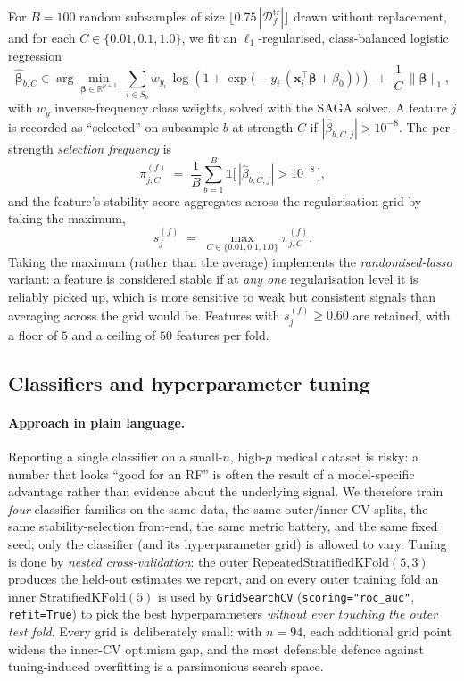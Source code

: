 \documentclass[11pt,a4paper]{article}
\begin{document}
For $B=100$ random subsamples of size
$\lfloor 0.75\,|\mathcal{D}_f^{\mathrm{tr}}|\rfloor$ drawn without
replacement, and for each $C \in \{0.01, 0.1, 1.0\}$, we fit an
$\ell_1$-regularised, class-balanced logistic regression
\begin{equation}
  \widehat{\bm{\beta}}_{b,C} \in
  \arg\min_{\bm{\beta}\in\mathbb{R}^{p+1}}
  \;\sum_{i\in S_b}
    w_{y_i}\,
    \log\!\left(1 + \exp\bigl(-y_i\,(\bm{x}_i^\top \bm{\beta} + \beta_0)\bigr)\right)
  \;+\; \frac{1}{C}\,\|\bm{\beta}\|_1,
  \label{eq:l1lr}
\end{equation}
with $w_y$ inverse-frequency class weights, solved with the SAGA solver.
A feature $j$ is recorded as ``selected'' on subsample $b$ at strength
$C$ if $|\widehat{\beta}_{b,C,j}| > 10^{-8}$. The per-strength
\emph{selection frequency} is
\[
  \pi_{j,C}^{(f)} \;=\; \frac{1}{B}\sum_{b=1}^{B}
    \mathbb{1}\bigl[\,|\widehat{\beta}_{b,C,j}|>10^{-8}\,\bigr],
\]
and the feature's stability score aggregates across the regularisation
grid by taking the maximum,
\begin{equation}
  s_j^{(f)} \;=\; \max_{C \in \{0.01, 0.1, 1.0\}} \pi_{j,C}^{(f)}.
  \label{eq:stab}
\end{equation}
Taking the maximum (rather than the average) implements the
\emph{randomised-lasso} variant: a feature is considered stable if at
\emph{any one} regularisation level it is reliably picked up, which is
more sensitive to weak but consistent signals than averaging across the
grid would be. Features with $s_j^{(f)} \ge 0.60$ are retained, with a
floor of $5$ and a ceiling of $50$ features per fold.

\subsection{Classifiers and hyperparameter tuning}
\label{sec:classifiers}

\paragraph{Approach in plain language.}
Reporting a single classifier on a small-$n$, high-$p$ medical dataset
is risky: a number that looks ``good for an RF'' is often the result of
a model-specific advantage rather than evidence about the underlying
signal. We therefore train \emph{four} classifier families on the same
data, the same outer/inner CV splits, the same stability-selection
front-end, the same metric battery, and the same fixed seed; only the
classifier (and its hyperparameter grid) is allowed to vary. Tuning is
done by \emph{nested cross-validation}: the outer
$\mathrm{RepeatedStratifiedKFold}(5,3)$ produces the held-out estimates
we report, and on every outer training fold an inner
$\mathrm{StratifiedKFold}(5)$ is used by \texttt{GridSearchCV}
(\texttt{scoring="roc\_auc"}, \texttt{refit=True}) to pick the best
hyperparameters \emph{without ever touching the outer test fold}. Every
grid is deliberately small: with $n=94$, each additional grid point
widens the inner-CV optimism gap, and the most defensible defence
against tuning-induced overfitting is a parsimonious search space.
\end{document}
